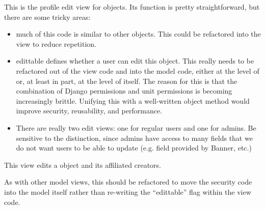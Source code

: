 \documentclass[letterpaper,10pt,english]{sphinxmanual}
\begin{document}
\begin{fulllineitems}
\label{generated/apps.profiles.views:apps.profiles.views.edit_student_profile}
This is the profile edit view for  objects.  Its function is pretty
straightforward, but there are some tricky areas:
\begin{itemize}
\item {} 
much of this code is similar to other  objects.  This could be
refactored into the  view to reduce repetition.

\item {} 
edittable defines whether a user can edit this object.  This really needs
to be refactored out of the view code and into the model code, either
at the level of  or, at least in part, at the level of
 itself.  The reason for this is that the combination of 
Django permissions and unit permissions is becoming increasingly brittle.
Unifying this with a well-written object method would improve security,
reusability, and performance.

\item {} 
There are really two edit views: one for regular users and one for admins.
Be sensitive to the distinction, since admins have access to many fields
that we do not want users to be able to update (e.g. field provided by
Banner, etc.)

\end{itemize}

\end{fulllineitems}



\begin{fulllineitems}
\label{generated/apps.profiles.views:apps.profiles.views.edit_work}
This view edits a  object and its affiliated creators.

As with other model views, this should be refactored to move the
security code into the model itself rather than re-writing the 
``edittable'' flag within the view code.

\end{fulllineitems}


\end{document}
